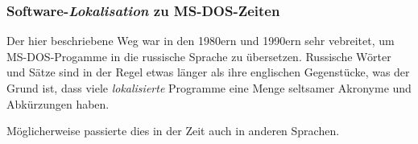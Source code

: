 %

\subsubsection{Software-\emph{Lokalisation} zu MS-DOS-Zeiten}

Der hier beschriebene Weg war in den 1980ern und  1990ern sehr vebreitet, um MS-DOS-Progamme in die russische Sprache zu übersetzen.
Russische Wörter und Sätze sind in der Regel etwas länger als ihre englischen Gegenstücke, was der Grund ist, dass
viele \emph{lokalisierte} Programme eine Menge seltsamer Akronyme und Abkürzungen haben.

Möglicherweise passierte dies in der Zeit auch in anderen Sprachen.
